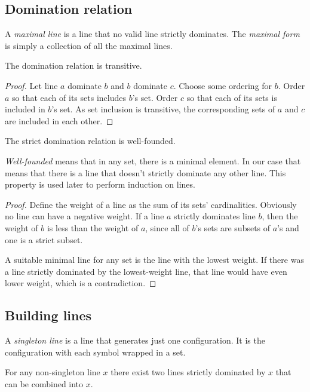 \documentclass[english, 12pt, a4paper, sci, a-1b, online]{aaltothesis}
\begin{document}
\subsection{Domination relation}

A \emph{maximal line} is a line that no valid line strictly dominates. The \emph{maximal form} is simply a collection of all the maximal lines.

\begin{lemma}
\label{domtrans}
The domination relation is transitive.
\end{lemma}

\begin{proof}
Let line $a$ dominate $b$ and $b$ dominate $c$. Choose some ordering for $b$. Order $a$ so that each of its sets includes $b$'s set. Order $c$ so that each of its sets is included in $b$'s set. As set inclusion is transitive, the corresponding sets of $a$ and $c$ are included in each other.
\end{proof}

\begin{lemma}
The strict domination relation is well-founded.
\end{lemma}

\emph{Well-founded} means that in any set, there is a minimal element. In our case that means that there is a line that doesn't strictly dominate any other line. This property is used later to perform induction on lines.

\begin{proof}
Define the weight of a line as the sum of its sets' cardinalities. Obviously no line can have a negative weight. If a line $a$ strictly dominates line $b$, then the weight of $b$ is less than the weight of $a$, since all of $b$'s sets are subsets of $a$'s and one is a strict subset.

A suitable minimal line for any set is the line with the lowest weight. If there was a line strictly dominated by the lowest-weight line, that line would have even lower weight, which is a contradiction.
\end{proof}

\subsection{Building lines}

A \emph{singleton line} is a line that generates just one configuration. It is the configuration with each symbol wrapped in a set.

\begin{lemma}
\label{linesplit}
For any non-singleton line $x$ there exist two lines strictly dominated by $x$ that can be combined into $x$.
\end{lemma}
\end{document}

